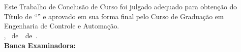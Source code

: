 \imprimircapa


\imprimirfolhaderosto*

\begin{fichacatalografica}
	
\end{fichacatalografica}

\begin{folhadeaprovacao}
	\OnehalfSpacing
	\centering
	\imprimirautor\\%
	\vspace{24pt}		
	\textbf{\imprimirtitulo}%
	\ifnotempty{\imprimirsubtitulo}{:~\imprimirsubtitulo}\\%
	\vspace*{\baselineskip}
	Este Trabalho de Conclusão de Curso foi julgado adequado para obtenção do Título de ``\imprimirformacao'' e aprovado em sua forma final pelo Curso de Graduação em Engenharia de Controle e Automação.\\
	\vspace{12pt}
	\imprimirlocal, \imprimirdia~de~\imprimirmes~de~\imprimirano.\\
	
	\vspace*{18pt}
	\textbf{Banca Examinadora:}\\
	
	\vspace*{24pt}
	\assinatura{\OnehalfSpacing \imprimirbancanomea}
	\vspace{6pt}
	\imprimirbancainsta\\
	
	\vspace*{24pt}
	\assinatura{\OnehalfSpacing \imprimirbancanomeb}
	\vspace{6pt}
	\imprimirbancainstb\\
	
	\vspace*{24pt}
	\assinatura{\OnehalfSpacing \imprimirbancanomec}
	\vspace{6pt}
	\imprimirbancainstc\\
	
\end{folhadeaprovacao}

\ifnotempty{\imprimirdedicatoriatcc}{
\begin{dedicatoria}
	\vspace*{\fill}
	\noindent
	\begin{adjustwidth*}{}{7.5cm} 
		\textit{\imprimirdedicatoriatcc}
	\end{adjustwidth*}
\end{dedicatoria}
}

